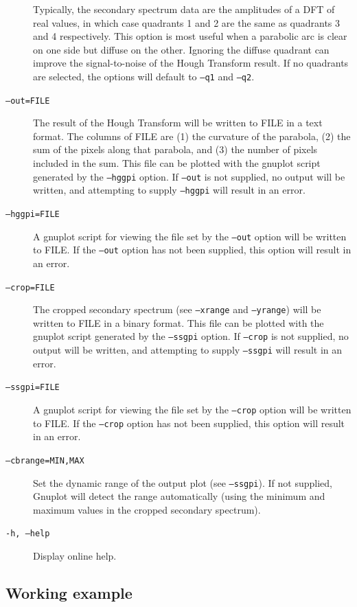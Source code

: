 \documentclass{article}
\begin{document}
\begin{description}
        Typically, the secondary spectrum data are the amplitudes of a DFT of real values, in which case quadrants 1 and 2 are the same as quadrants 3 and 4 respectively. This option is most useful when a parabolic arc is clear on one side but diffuse on the other. Ignoring the diffuse quadrant can improve the signal-to-noise of the Hough Transform result. If no quadrants are selected, the options will default to \texttt{--q1} and \texttt{--q2}.
    \item[\texttt{--out=FILE}] The result of the Hough Transform will be written to FILE in a text format. The columns of FILE are (1) the curvature of the parabola, (2) the sum of the pixels along that parabola, and (3) the number of pixels included in the sum. This file can be plotted with the gnuplot script generated by the \texttt{--hggpi} option. If \texttt{--out} is not supplied, no output will be written, and attempting to supply \texttt{--hggpi} will result in an error.
    \item[\texttt{--hggpi=FILE}] A gnuplot script for viewing the file set by the \texttt{--out} option will be written to FILE. If the \texttt{--out} option has not been supplied, this option will result in an error.
    \item[\texttt{--crop=FILE}] The cropped secondary spectrum (see \texttt{--xrange} and \texttt{--yrange}) will be written to FILE in a binary format. This file can be plotted with the gnuplot script generated by the \texttt{--ssgpi} option. If \texttt{--crop} is not supplied, no output will be written, and attempting to supply \texttt{--ssgpi} will result in an error.
    \item[\texttt{--ssgpi=FILE}] A gnuplot script for viewing the file set by the \texttt{--crop} option will be written to FILE. If the \texttt{--crop} option has not been supplied, this option will result in an error.
    \item[\texttt{--cbrange=MIN,MAX}] Set the dynamic range of the output plot (see \texttt{--ssgpi}). If not supplied, Gnuplot will detect the range automatically (using the minimum and maximum values in the cropped secondary spectrum).
    \item[\texttt{-h, --help}] Display online help.
\end{description}

\subsection{Working example}
\end{document}
